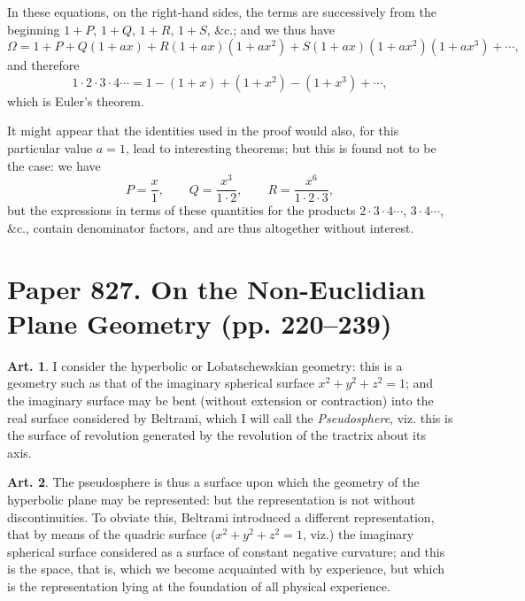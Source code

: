 \documentclass[11pt,a4paper]{article}
\theoremstyle{definition}
\newtheorem{art}{Art.}[section]
\begin{document}
In these equations, on the right-hand sides, the terms are successively from the beginning $1+P$, $1+Q$, $1+R$, $1+S$, \&c.; and we thus have
\[
\Omega = 1 + P + Q(1+ax) + R(1+ax)(1+ax^2) + S(1+ax)(1+ax^2)(1+ax^3) + \cdots,
\]
and therefore
\[
1 \cdot 2 \cdot 3 \cdot 4 \cdots = 1 - (1+x) + (1+x^2) - (1+x^3) + \cdots,
\]
which is Euler's theorem.

It might appear that the identities used in the proof would also, for this particular value $a=1$, lead to interesting theorems; but this is found not to be the case: we have
\[
P = \frac{x}{1}, \qquad Q = \frac{x^3}{1\cdot 2}, \qquad R = \frac{x^6}{1\cdot 2\cdot 3},
\]
but the expressions in terms of these quantities for the products $2\cdot 3\cdot 4\cdots$, $3\cdot 4\cdots$, \&c., contain denominator factors, and are thus altogether without interest.

\newpage
\section{Paper 827. On the Non-Euclidian Plane Geometry (pp. 220--239)}


\begin{art}
I consider the hyperbolic or Lobatschewskian geometry: this is a geometry such as that of the imaginary spherical surface $x^2 + y^2 + z^2 = 1$; and the imaginary surface may be bent (without extension or contraction) into the real surface considered by Beltrami, which I will call the \textit{Pseudosphere}, viz. this is the surface of revolution generated by the revolution of the tractrix about its axis.
\end{art}

\begin{art}
The pseudosphere is thus a surface upon which the geometry of the hyperbolic plane may be represented: but the representation is not without discontinuities. To obviate this, Beltrami introduced a different representation, that by means of the quadric surface ($x^2+y^2+z^2=1$, viz.) the imaginary spherical surface considered as a surface of constant negative curvature; and this is the space, that is, which we become acquainted with by experience, but which is the representation lying at the foundation of all physical experience.
\end{art}
\end{document}
